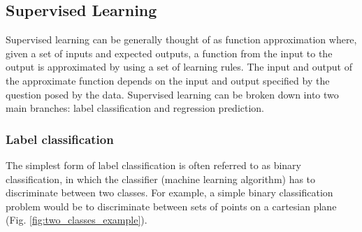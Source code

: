 
\subsection{Supervised Learning}
\label{sec:supervised_learning}

Supervised learning can be generally thought of as function approximation where, given a set of inputs and expected outputs, a function from the input to the output is approximated by using a set of learning rules. The input and output of the approximate function depends on the input and output specified by the question posed by the data. Supervised learning can be broken down into two main branches: label classification and regression prediction. 

\subsubsection{Label classification}
\label{sec:label_classification}
The simplest form of label classification is often referred to as binary classification, in which the classifier (machine learning algorithm) has to discriminate between two classes. For example, a simple binary classification problem would be to discriminate between sets of points on a cartesian plane (Fig. \ref{fig:two_classes_example}).

